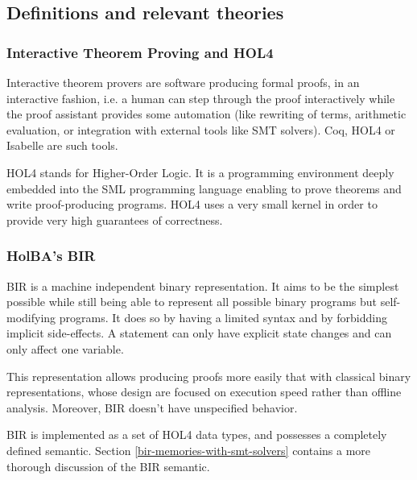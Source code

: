 \documentclass[10pt,a4paper]{article}
\begin{document}
\begin{multicols}{2}

\subsection{Definitions and relevant theories}

\subsubsection{Interactive Theorem Proving and HOL4} \label{hol4-presentation}

Interactive theorem provers are software producing formal proofs, in an
interactive fashion, i.e. a human can step through the proof interactively while the proof assistant provides some automation (like rewriting of terms, arithmetic evaluation, or integration with external tools like SMT solvers). Coq, HOL4 or Isabelle are such tools.

HOL4 stands for Higher-Order Logic. It is a programming environment deeply embedded into the {SML} programming language enabling to prove theorems and write {proof-producing} programs. HOL4 uses a very small kernel in order to provide very high guarantees of correctness.

\subsubsection{HolBA's BIR} \label{bir-presentation}

BIR is a machine independent binary representation. It aims to be the simplest possible while still being able to represent all possible binary programs but self-modifying programs. It does so by having a limited syntax and by forbidding implicit side-effects. A statement can only have explicit state changes and can only affect one variable.

This representation allows producing proofs more easily that with classical binary representations, whose design are focused on execution speed rather than offline analysis. Moreover, BIR doesn't have unspecified behavior.

BIR is implemented as a set of HOL4 data types, and possesses a completely defined semantic. Section \ref{bir-memories-with-smt-solvers} contains a more thorough discussion of the BIR semantic.


\end{multicols}
\end{document}
